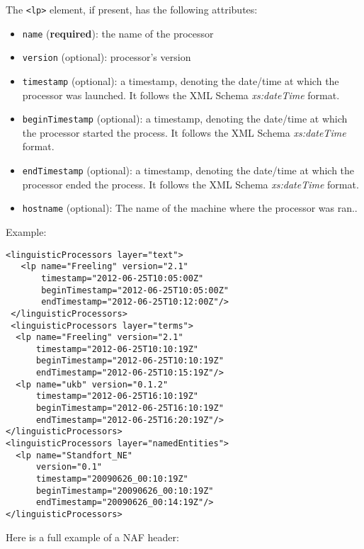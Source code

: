 The \texttt{<lp>} element, if present, has the following attributes:
\begin{itemize}
\item \texttt{name} (\textbf{required}): the name of the processor
\item \texttt{version} (optional): processor's version
\item \texttt{timestamp} (optional): a timestamp, denoting the
  date/time at which the processor was launched. It follows the XML
  Schema \emph{xs:dateTime} format.
\item \texttt{beginTimestamp} (optional): a timestamp, denoting the
  date/time at which the processor started the process. It follows the XML Schema
  \emph{xs:dateTime} format.
\item \texttt{endTimestamp} (optional): a timestamp, denoting the date/time
  at which the processor ended the process. It follows the XML Schema
  \emph{xs:dateTime} format.
\item \texttt{hostname} (optional): The name of the machine where the
  processor was ran..
\end{itemize}

Example:

\begin{Verbatim}
<linguisticProcessors layer="text">
   <lp name="Freeling" version="2.1"
       timestamp="2012-06-25T10:05:00Z"
       beginTimestamp="2012-06-25T10:05:00Z"
       endTimestamp="2012-06-25T10:12:00Z"/>
 </linguisticProcessors>
 <linguisticProcessors layer="terms">
  <lp name="Freeling" version="2.1"
      timestamp="2012-06-25T10:10:19Z"
      beginTimestamp="2012-06-25T10:10:19Z"
      endTimestamp="2012-06-25T10:15:19Z"/>
  <lp name="ukb" version="0.1.2"
      timestamp="2012-06-25T16:10:19Z"
      beginTimestamp="2012-06-25T16:10:19Z"
      endTimestamp="2012-06-25T16:20:19Z"/>
</linguisticProcessors>
<linguisticProcessors layer="namedEntities">
  <lp name="Standfort_NE"
      version="0.1"
      timestamp="20090626_00:10:19Z"
      beginTimestamp="20090626_00:10:19Z"
      endTimestamp="20090626_00:14:19Z"/>
</linguisticProcessors>
\end{Verbatim}

Here is a full example of a NAF header:

